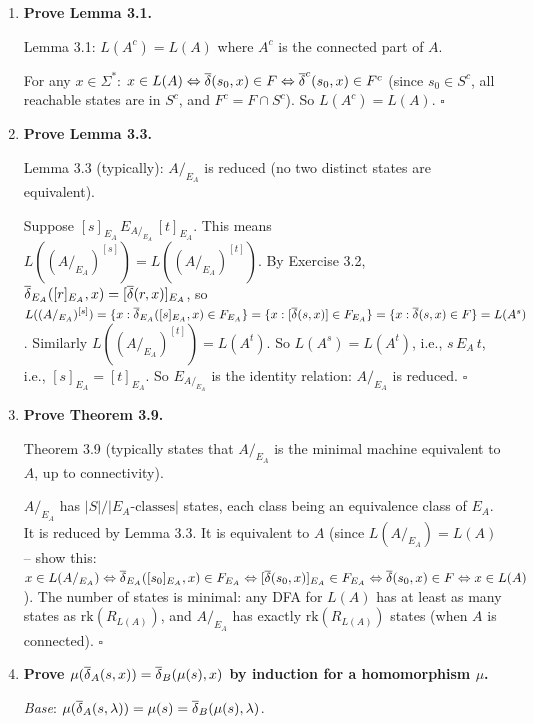 \begin{enumerate}[{3.}1.]
\item \textbf{Prove Lemma 3.1.}

Lemma 3.1: $L(A^c)=L(A)$ where $A^c$ is the connected part of $A$.

For any $x\in\Sigma^*$: $x\in L(A)\Leftrightarrow\overline{\delta}(s_0,x)\in F\Leftrightarrow\overline{\delta}^c(s_0,x)\in F^c$ (since $s_0\in S^c$, all reachable states are in $S^c$, and $F^c=F\cap S^c$). So $L(A^c)=L(A)$. $\square$

\item \textbf{Prove Lemma 3.3.}

Lemma 3.3 (typically): $A/_{E_A}$ is reduced (no two distinct states are equivalent).

Suppose $[s]_{E_A}\,E_{A/_{E_A}}\,[t]_{E_A}$. This means $L((A/_{E_A})^{[s]})=L((A/_{E_A})^{[t]})$. By Exercise 3.2, $\overline{\delta}_{E_A}([r]_{E_A},x)=[\overline{\delta}(r,x)]_{E_A}$, so $L((A/_{E_A})^{[s]})=\{x:\overline{\delta}_{E_A}([s]_{E_A},x)\in F_{E_A}\}=\{x:[\overline{\delta}(s,x)]\in F_{E_A}\}=\{x:\overline{\delta}(s,x)\in F\}=L(A^s)$. Similarly $L((A/_{E_A})^{[t]})=L(A^t)$. So $L(A^s)=L(A^t)$, i.e., $s\,E_A\,t$, i.e., $[s]_{E_A}=[t]_{E_A}$. So $E_{A/_{E_A}}$ is the identity relation: $A/_{E_A}$ is reduced. $\square$

\item \textbf{Prove Theorem 3.9.}

Theorem 3.9 (typically states that $A/_{E_A}$ is the minimal machine equivalent to $A$, up to connectivity).

$A/_{E_A}$ has $|S|/|E_A\text{-classes}|$ states, each class being an equivalence class of $E_A$. It is reduced by Lemma 3.3. It is equivalent to $A$ (since $L(A/_{E_A})=L(A)$ -- show this: $x\in L(A/_{E_A})\Leftrightarrow\overline{\delta}_{E_A}([s_0]_{E_A},x)\in F_{E_A}\Leftrightarrow[\overline{\delta}(s_0,x)]_{E_A}\in F_{E_A}\Leftrightarrow\overline{\delta}(s_0,x)\in F\Leftrightarrow x\in L(A)$). The number of states is minimal: any DFA for $L(A)$ has at least as many states as $\mathrm{rk}(R_{L(A)})$, and $A/_{E_A}$ has exactly $\mathrm{rk}(R_{L(A)})$ states (when $A$ is connected). $\square$

\item \textbf{Prove $\mu(\overline{\delta}_A(s,x))=\overline{\delta}_B(\mu(s),x)$ by induction for a homomorphism $\mu$.}

\textit{Base}: $\mu(\overline{\delta}_A(s,\lambda))=\mu(s)=\overline{\delta}_B(\mu(s),\lambda)$. \checkmark


\end{enumerate}
